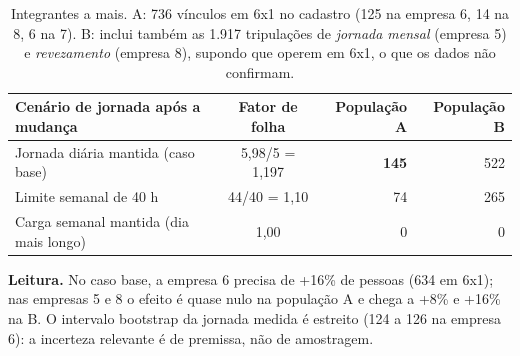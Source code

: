 \documentclass[11pt,a4paper]{article}
\begin{document}
\begin{table}[h]
\centering\small
\begin{tabular}{lcrr}
\toprule
Cenário de jornada após a mudança & Fator de folha & População A & População B \\
\midrule
Jornada diária mantida (caso base) & 5,98/5 = 1,197 & \textbf{145} & 522 \\
Limite semanal de 40 h & 44/40 = 1,10 & 74 & 265 \\
Carga semanal mantida (dia mais longo) & 1,00 & 0 & 0 \\
\bottomrule
\end{tabular}
\caption{Integrantes a mais. A: 736 vínculos em 6x1 no cadastro (125 na empresa 6, 14 na 8, 6 na 7). B: inclui também as 1.917 tripulações de \emph{jornada mensal} (empresa 5) e \emph{revezamento} (empresa 8), supondo que operem em 6x1, o que os dados não confirmam.}
\end{table}

\begin{table}[htbp]
\centering\small
{}
\caption{Integrantes a mais por empresa com a mudança para 5x2 (no cenário de carga semanal mantida, o adicional é zero em todas). Intervalo bootstrap da jornada medida na empresa 6, caso base: 123,8 a 125,5.}
\end{table}

\textbf{Leitura.} No caso base, a empresa 6 precisa de +16\% de pessoas (634 em 6x1); nas empresas 5 e 8 o efeito é quase nulo na população A e chega a +8\% e +16\% na B. O intervalo bootstrap da jornada medida é estreito (124 a 126 na empresa 6): a incerteza relevante é de premissa, não de amostragem.
\end{document}
